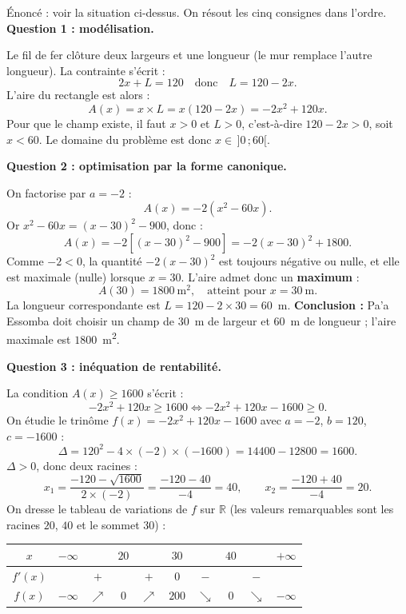 \documentclass[11pt]{article}
\newcounter{popsec}
\newcounter{popsub}
\newcommand{\courssub}[1]{%
  \stepcounter{popsub}%
  \par\vspace{9pt}\noindent{\popxbold\fontsize{11.5}{13}\selectfont\color{popink}{\color{poporange}\thepopsec.\thepopsub}\hspace{6pt}#1}\par\nopagebreak\vspace{4pt}
}
\begin{document}
\courssub{Démarche et corrigé commenté}

\begin{exoresolu}
Énoncé : voir la situation ci-dessus. On résout les cinq consignes dans l'ordre.
\tcblower
\textbf{Question 1 : modélisation.}

Le fil de fer clôture deux largeurs et une longueur (le mur remplace l'autre longueur). La contrainte s'écrit :
\[ 2x + L = 120 \quad \text{donc} \quad L = 120 - 2x. \]
L'aire du rectangle est alors :
\[ A(x) = x \times L = x(120 - 2x) = -2x^2 + 120x. \]
Pour que le champ existe, il faut $x > 0$ et $L > 0$, c'est-à-dire $120 - 2x > 0$, soit $x < 60$. Le domaine du problème est donc $x \in \,]0\,; 60[$.

\textbf{Question 2 : optimisation par la forme canonique.}

On factorise par $a = -2$ :
\[ A(x) = -2\left(x^2 - 60x\right). \]
Or $x^2 - 60x = (x - 30)^2 - 900$, donc :
\[ A(x) = -2\left[(x-30)^2 - 900\right] = -2(x-30)^2 + 1800. \]
Comme $-2 < 0$, la quantité $-2(x-30)^2$ est toujours négative ou nulle, et elle est maximale (nulle) lorsque $x = 30$. L'aire admet donc un \textbf{maximum} :
\[ A(30) = 1800 \ \text{m}^2, \quad \text{atteint pour } x = 30 \ \text{m}. \]
La longueur correspondante est $L = 120 - 2 \times 30 = 60$~m. \textbf{Conclusion :} Pa'a Essomba doit choisir un champ de $30$~m de largeur et $60$~m de longueur ; l'aire maximale est $\num{1800}$~m\textsuperscript{2}.

\textbf{Question 3 : inéquation de rentabilité.}

La condition $A(x) \geq \num{1600}$ s'écrit :
\[ -2x^2 + 120x \geq 1600 \iff -2x^2 + 120x - 1600 \geq 0. \]
On étudie le trinôme $f(x) = -2x^2 + 120x - 1600$ avec $a = -2$, $b = 120$, $c = -1600$ :
\[ \Delta = 120^2 - 4 \times (-2) \times (-1600) = 14400 - 12800 = 1600. \]
$\Delta > 0$, donc deux racines :
\[ x_1 = \frac{-120 - \sqrt{1600}}{2 \times (-2)} = \frac{-120 - 40}{-4} = 40, \qquad x_2 = \frac{-120 + 40}{-4} = 20. \]
On dresse le tableau de variations de $f$ sur $\mathbb{R}$ (les valeurs remarquables sont les racines $20$, $40$ et le sommet $30$) :

\begin{center}
\begin{tabular}{|c|ccccccccc|}\hline
$x$ & $-\infty$ & & $20$ & & $30$ & & $40$ & & $+\infty$ \\ \hline
$f'(x)$ & & $+$ & & $+$ & $0$ & $-$ & & $-$ & \\ \hline
$f(x)$ & $-\infty$ & $\nearrow$ & $0$ & $\nearrow$ & $200$ & $\searrow$ & $0$ & $\searrow$ & $-\infty$ \\ \hline
\end{tabular}
\end{center}


\end{exoresolu}
\end{document}
